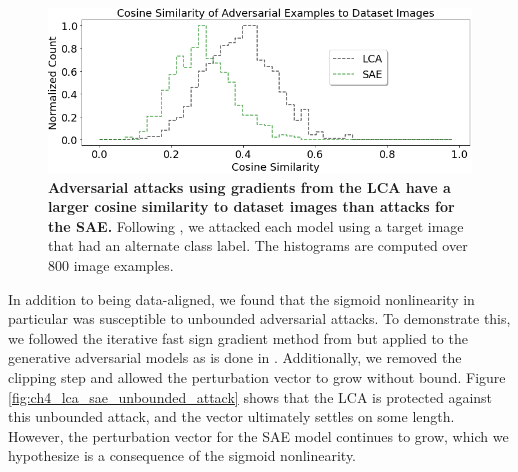 \begin{figure}[h]
    \begin{center}
    \centerline{\includegraphics[width=\columnwidth]{figures/cosyne_similarity.png}}
    \end{center}
    \caption{\textbf{Adversarial attacks using gradients from the LCA have a larger cosine similarity to dataset images than attacks for the SAE.} Following \parencite{kos2018adversarial, kurakin2016adversarial}, we attacked each model using a target image that had an alternate class label. The histograms are computed over 800 image examples.}
    \label{fig:ch4_cosine_similarity}
\end{figure}

In addition to being data-aligned, we found that the sigmoid nonlinearity in particular was susceptible to unbounded adversarial attacks. To demonstrate this, we followed the iterative fast sign gradient method from \parencite{kurakin2016adversarial} but applied to the generative adversarial models as is done in \parencite{kos2018adversarial}. Additionally, we removed the clipping step and allowed the perturbation vector to grow without bound. Figure \ref{fig:ch4_lca_sae_unbounded_attack} shows that the LCA is protected against this unbounded attack, and the vector ultimately settles on some length. However, the perturbation vector for the SAE model continues to grow, which we hypothesize is a consequence of the sigmoid nonlinearity.

